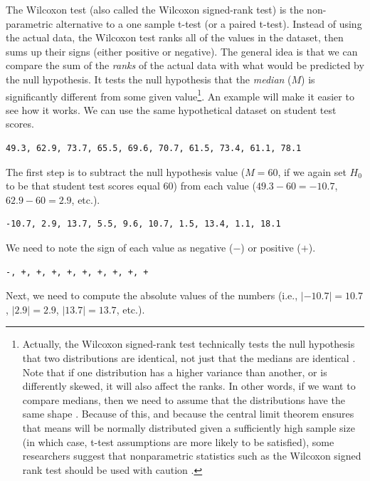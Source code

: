 \documentclass[
  openany]{scrbook}
\begin{document}
The Wilcoxon test (also called the Wilcoxon signed-rank test) is the non-parametric alternative to a one sample t-test (or a paired t-test).
Instead of using the actual data, the Wilcoxon test ranks all of the values in the dataset, then sums up their signs (either positive or negative).
The general idea is that we can compare the sum of the \emph{ranks} of the actual data with what would be predicted by the null hypothesis.
It tests the null hypothesis that the \emph{median} (\(M\)) is significantly different from some given value\footnote{Actually, the Wilcoxon signed-rank test technically tests the null hypothesis that two distributions are identical, not just that the medians are identical \citep{Johnson1995, Lumley2002}. Note that if one distribution has a higher variance than another, or is differently skewed, it will also affect the ranks. In other words, if we want to compare medians, then we need to assume that the distributions have the same shape \citep{Lumley2002}. Because of this, and because the central limit theorem ensures that means will be normally distributed given a sufficiently high sample size (in which case, t-test assumptions are more likely to be satisfied), some researchers suggest that nonparametric statistics such as the Wilcoxon signed rank test should be used with caution \citep{Johnson1995}.}.
An example will make it easier to see how it works.
We can use the same hypothetical dataset on student test scores.

\begin{verbatim}
49.3, 62.9, 73.7, 65.5, 69.6, 70.7, 61.5, 73.4, 61.1, 78.1
\end{verbatim}

The first step is to subtract the null hypothesis value (\(M = 60\), if we again set \(H_{0}\) to be that student test scores equal 60) from each value (\(49.3 - 60 = -10.7\), \(62.9 - 60 = 2.9\), etc.).

\begin{verbatim}
-10.7, 2.9, 13.7, 5.5, 9.6, 10.7, 1.5, 13.4, 1.1, 18.1
\end{verbatim}

We need to note the sign of each value as negative (\(-\)) or positive (\(+\)).

\begin{verbatim}
-, +, +, +, +, +, +, +, +, +
\end{verbatim}

Next, we need to compute the absolute values of the numbers (i.e., \(|-10.7| = 10.7\), \(|2.9| = 2.9\), \(|13.7| = 13.7\), etc.).
\end{document}
